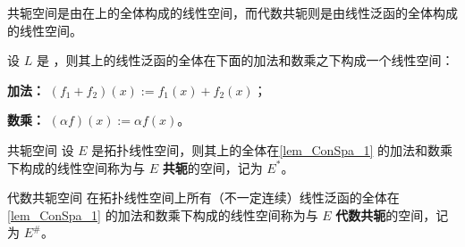 
\cite{Ke1}共轭空间是由在上的全体构成的线性空间，而代数共轭则是由线性泛函的全体构成的线性空间。

\begin{lemma}{}\label{lem_ConSpa_1}
设 $L$ 是 ，则其上的线性泛函的全体在下面的加法和数乘之下构成一个线性空间：

\textbf{加法：} $(f_1+f_2)(x):=f_1(x)+f_2(x)$；

\textbf{数乘：} $(\alpha f)(x):=\alpha f(x)$。
\end{lemma}

\begin{definition}{共轭空间}
设 $E$ 是拓扑线性空间，则其上的全体在\autoref{lem_ConSpa_1} 的加法和数乘下构成的线性空间称为与 $E$ \textbf{共轭}的空间，记为 $E^*$。
\end{definition}

\begin{definition}{代数共轭空间}
在拓扑线性空间上所有（不一定连续）线性泛函的全体在\autoref{lem_ConSpa_1} 的加法和数乘下构成的线性空间称为与 $E$ \textbf{代数共轭}的空间，记为 $E^{\#}$。
\end{definition}




